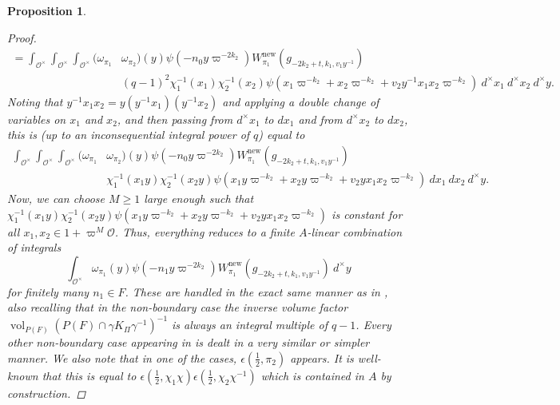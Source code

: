 \documentclass{amsart}
\theoremstyle{plain}
\newtheorem{prop}[thm]{Proposition}
\theoremstyle{plain}
\theoremstyle{remark}
\DeclareMathOperator{\vol}{vol}
\begin{document}
\begin{prop}
\begin{proof}
           \begin{align*}=\int_{\mathcal{O}^\times}\int_{\mathcal{O}^\times}\int_{\mathcal{O}^\times} (\omega_{\pi_1}&\omega_{\pi_2})(y)\psi(-n_0y\varpi^{-2k_2})W_{\pi_1}^\mathrm{new}(g_{-2k_2+t,k_1,v_1y^{-1}}) \\
           &(q-1)^2\chi_1^{-1}(x_1)\chi_2^{-1}(x_2)\psi(x_1\varpi^{-k_2}+x_2\varpi^{-k_2}+v_2y^{-1}x_1x_2\varpi^{-k_2})\ d^\times x_1\ d^\times x_2\ d^\times y.
        \end{align*}
        Noting that $y^{-1}x_1x_2=y(y^{-1}x_1)(y^{-1}x_2)$ and applying a double change of variables on $x_1$ and $x_2$, and then passing from $d^\times x_1$ to $dx_1$ and from $d^\times x_2$ to $dx_2$, this is (up to an inconsequential integral power of $q$) equal to
        \begin{align*}\int_{\mathcal{O}^\times}\int_{\mathcal{O}^\times}\int_{\mathcal{O}^\times} (\omega_{\pi_1}&\omega_{\pi_2})(y)\psi(-n_0y\varpi^{-2k_2})W_{\pi_1}^\mathrm{new}(g_{-2k_2+t,k_1,v_1y^{-1}}) \\
           &\chi_1^{-1}(x_1y)\chi_2^{-1}(x_2y)\psi(x_1y\varpi^{-k_2}+x_2y\varpi^{-k_2}+v_2yx_1x_2\varpi^{-k_2})\ dx_1\ dx_2\ d^\times y.
        \end{align*}
        Now, we can choose $M\geq 1$ large enough such that
        $\chi_1^{-1}(x_1y)\chi_2^{-1}(x_2y)\psi(x_1y\varpi^{-k_2}+x_2y\varpi^{-k_2}+v_2yx_1x_2\varpi^{-k_2})$ is constant for all $x_1,x_2\in 1+ \varpi^M\mathcal{O}$. Thus, everything reduces to a finite $A$-linear combination of integrals 
        $$\int_{\mathcal{O}^\times}\omega_{\pi_1}(y)\psi(-n_1y\varpi^{-2k_2}) W_{\pi_1}^\mathrm{new}(g_{-2k_2+t,k_1,v_1y^{-1}})\ d^\times y$$
        for finitely many $n_1\in F$. These are handled in the exact same manner as in , also recalling that in the non-boundary case the inverse volume factor $\vol_{P(F)}(P(F)\cap \gamma K_\Pi\gamma^{-1})^{-1}$ is always an integral multiple of $q-1$. Every other non-boundary case appearing in \cite[Lemma $3.6$]{Assing_2018} is dealt in a very similar or simpler manner. We also note that in one of the cases, $\epsilon(\tfrac{1}{2},\pi_2)$ appears. It is well-known that this is equal to $\epsilon(\tfrac{1}{2},\chi_1\chi)\epsilon(\tfrac{1}{2},\chi_2\chi^{-1})$ which is contained in $A$ by construction.
    \end{proof}
\end{prop}
\end{document}
